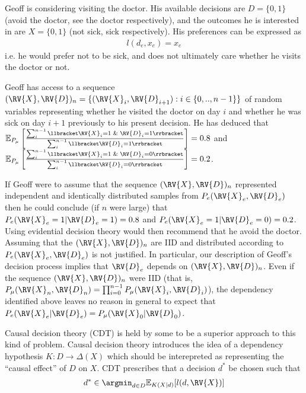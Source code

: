 \begin{example}\label{ex:doctor}
Geoff is considering visiting the doctor. His available decisions are $D=\{0,1\}$ (avoid the doctor, see the doctor respectively), and the outcomes he is interested in are $X=\{0,1\}$ (not sick, sick respectively). His preferences can be expressed as
\begin{align}
    l(d_e,x_e) = x_e
\end{align}
i.e. he would prefer not to be sick, and does not ultimately care whether he visits the doctor or not.

Geoff has access to a sequence $(\RV{X},\RV{D})_n=\{(\RV{X}_i,\RV{D}_{i+1}):i\in\{0,..,n-1\}\}$ of random variables representing whether he visited the doctor on day $i$ and whether he was sick on day $i+1$ previously to his present decision. He has deduced that $\mathbb{E}_{P_\mu}\left[\frac{\sum_i^{n-1} \llbracket \RV{X}_i=1\And \RV{D}_i=1\rrbracket}{\sum_i^{n-1} \llbracket \RV{D}_i=1\rrbracket}\right]=0.8$ and $\mathbb{E}_{P_{\mu}}\left[\frac{\sum_i^{n-1} \llbracket \RV{X}_i=1\And \RV{D}_i=0\rrbracket}{\sum_i^{n-1} \llbracket \RV{D}_i=0\rrbracket}\right]=0.2$.
\end{example}

If Geoff were to assume that the sequence $(\RV{X},\RV{D})_n$ represented independent and identically distributed samples from $P_{e}(\RV{X}_e,\RV{D}_e)$ then he could conclude (if $n$ were large) that $P_{e}(\RV{X}_e=1|\RV{D}_e=1)=0.8$ and $P_{e}(\RV{X}_e=1|\RV{D}_e=0)=0.2$. Using evidential decision theory would then recommend that he avoid the doctor. Assuming that the $(\RV{X},\RV{D})_n$ are IID and distributed according to $P_{e}(\RV{X}_e,\RV{D}_e)$ is not justified. In particular, our description of Geoff's decision process implies that $\RV{D}_e$ depends on $(\RV{X},\RV{D})_n$. Even if the sequence $(\RV{X},\RV{D})_n$ were IID (that is, $P_{\mu}(\RV{X}_n,\RV{D}_n) = \prod_{i=0}^{n-1} P_{\mu}(\RV{X}_i,\RV{D}_i)$), the dependency identified above leaves no reason in general to expect that $P_{e}(\RV{X}_e|\RV{D}_e)=P_{\mu}(\RV{X}_0|\RV{D}_0)$.

Causal decision theory (CDT) is held by some to be a superior approach to this kind of problem\cite{lewis_causal_1981}. Causal decision theory introduces the idea of a dependency hypothesis $K:D\to \Delta(X)$ which should be interepreted as representing the ``causal effect'' of $D$ on $X$. CDT prescribes that a decision $d^*$ be chosen such that
\begin{align}
    d^* \in \argmin_{d\in D} \mathbb{E}_{K(X|d)}[l(d,\RV{X})]
\end{align}



